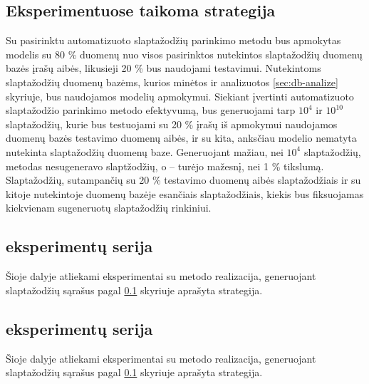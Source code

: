 \documentclass{VUMIFInfBakalaurinis}
\begin{document}
\subsection{Eksperimentuose taikoma strategija} \label{sec:strategy}
Su pasirinktu automatizuoto slaptažodžių parinkimo metodu bus apmokytas modelis 
su 80 \% duomenų nuo visos pasirinktos nutekintos slaptažodžių duomenų bazės 
įrašų aibės, likusieji 20 \% bus naudojami testavimui. Nutekintoms slaptažodžių 
duomenų bazėms, kurios minėtos ir analizuotos \ref{sec:db-analize} skyriuje, bus 
naudojamos modelių apmokymui. Siekiant įvertinti automatizuoto slaptažodžio 
parinkimo metodo efektyvumą, bus generuojami tarp $10^{4}$ ir $10^{10}$ 
slaptažodžių, kurie bus testuojami su 20 \% įrašų iš apmokymui naudojamos 
duomenų bazės testavimo duomenų aibės, ir su kita, anksčiau modelio nematyta 
nutekinta slaptažodžių duomenų baze. Generuojant mažiau, nei $10^{4}$ 
slaptažodžių,  metodas nesugeneravo slaptžodžių, o 
 -- turėjo mažesnį, nei 1 \% tikslumą. Slaptažodžių, sutampančių 
su 20 \% testavimo duomenų aibės slaptažodžiais ir su kitoje nutekintoje duomenų 
bazėje esančiais slaptažodžiais, kiekis bus fiksuojamas kiekvienam sugeneruotų 
slaptažodžių rinkiniui.

\subsection{ eksperimentų serija}
Šioje dalyje atliekami eksperimentai su  metodo 
realizacija\footnotemark, generuojant slaptažodžių sąrašus pagal 
\ref{sec:strategy} skyriuje aprašyta strategija.


\subsection{ eksperimentų serija}
Šioje dalyje atliekami eksperimentai su  metodo 
realizacija\footnotemark, generuojant slaptažodžių sąrašus pagal 
\ref{sec:strategy} skyriuje aprašyta strategija.

\end{document}
